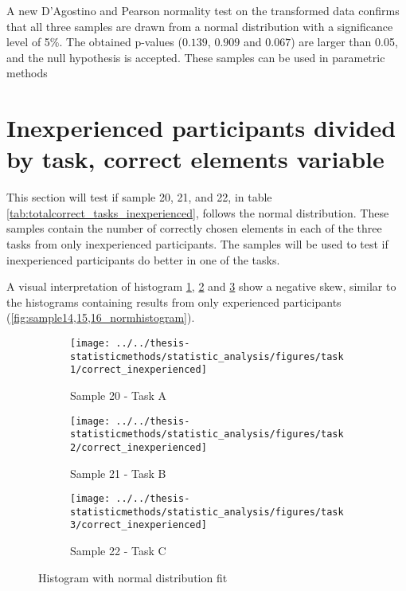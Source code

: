 \begin{appendices}
A new D'Agostino and Pearson normality test on the transformed data confirms that all three samples are drawn from a normal distribution with a significance level of 5\%. The obtained p-values ($0.139$, $0.909$ and $0.067$) are larger than 0.05, and the null hypothesis is accepted. These samples can be used in parametric methods \\[0.2cm]

\section{Inexperienced participants  divided by task, correct elements variable}\label{app:norm_20_21_22}

This section will test if sample 20, 21, and 22, in table \ref{tab:totalcorrect_tasks_inexperienced}, follows the normal distribution. These samples contain the number of correctly chosen elements in each of the three tasks from only inexperienced participants. The samples will be used to test if inexperienced participants do better in one of the tasks. 

A visual interpretation of histogram \ref{fig:correctinexperienced_task1}, \ref{fig:correctinexperienced_task2} and \ref{fig:correctinexperienced_task3} show a negative skew, similar to the histograms containing results from only experienced participants (\ref{fig:sample14,15,16_normhistogram}).

\begin{figure}[H]
	\centering
	\begin{subfigure}[b]{0.32\textwidth}
		\centering
		\texttt{[image: ../../thesis-statisticmethods/statistic\_analysis/figures/task1/correct\_inexperienced]}
		\caption{Sample 20 - Task A}
		\label{fig:correctinexperienced_task1}
	\end{subfigure}
	\begin{subfigure}[b]{0.32\textwidth}
		\centering
		\texttt{[image: ../../thesis-statisticmethods/statistic\_analysis/figures/task2/correct\_inexperienced]}
		\caption{Sample 21 - Task B}
		\label{fig:correctinexperienced_task2}
	\end{subfigure}
	\begin{subfigure}[b]{0.32\textwidth}
		\centering
		\texttt{[image: ../../thesis-statisticmethods/statistic\_analysis/figures/task3/correct\_inexperienced]}
		\caption{Sample 22 - Task C}
		\label{fig:correctinexperienced_task3}
	\end{subfigure}
	\caption{Histogram with normal distribution fit}
	\label{fig:sample20,21,22_normtest_original}
\end{figure}


\end{appendices}
